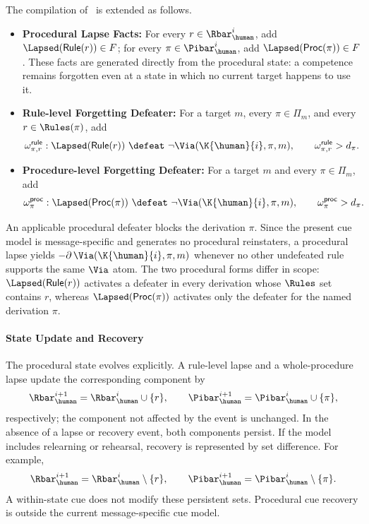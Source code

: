 The compilation of~ is extended as follows.
\begin{itemize}
    \item \textbf{Procedural Lapse Facts:} For every $r\in\Rbar_{\human}^{i}$, add $\Lapsed(\mathsf{Rule}(r))\in F$; for every $\pi\in\Pibar_{\human}^{i}$, add $\Lapsed(\mathsf{Proc}(\pi))\in F$. These facts are generated directly from the procedural state: a competence remains forgotten even at a state in which no current target happens to use it.

    \item \textbf{Rule-level Forgetting Defeater:} For a target $m$, every $\pi\in\Pi_m$, and every $r\in\Rules(\pi)$, add
    \[
        \omega^{\mathsf{rule}}_{\pi,r}: \Lapsed(\mathsf{Rule}(r)) \ \defeat\ \neg\Via(\K{\human}{i},\pi,m), \qquad \omega^{\mathsf{rule}}_{\pi,r}>d_\pi.
    \]

    \item \textbf{Procedure-level Forgetting Defeater:} For a target $m$ and every $\pi\in\Pi_m$, add
    \[
        \omega^{\mathsf{proc}}_{\pi}: \Lapsed(\mathsf{Proc}(\pi)) \ \defeat\ \neg\Via(\K{\human}{i},\pi,m), \qquad \omega^{\mathsf{proc}}_{\pi}>d_\pi.
    \]
\end{itemize}
An applicable procedural defeater blocks the derivation $\pi$. Since the present cue model is message-specific and generates no procedural reinstaters, a procedural lapse yields $-\partial\,\Via(\K{\human}{i},\pi,m)$ whenever no other undefeated rule supports the same $\Via$ atom. The two procedural forms differ in scope: $\Lapsed(\mathsf{Rule}(r))$ activates a defeater in every derivation whose $\Rules$ set contains $r$, whereas $\Lapsed(\mathsf{Proc}(\pi))$ activates only the defeater for the named derivation $\pi$.

\paragraph{State Update and Recovery}

The procedural state evolves explicitly. A rule-level lapse and a whole-procedure lapse update the corresponding component by
\[
    \Rbar_{\human}^{i+1} =\Rbar_{\human}^{i}\cup\{r\}, \qquad \Pibar_{\human}^{i+1} =\Pibar_{\human}^{i}\cup\{\pi\},
\]
respectively; the component not affected by the event is unchanged. In the absence of a lapse or recovery event, both components persist. If the model includes relearning or rehearsal, recovery is represented by set difference. For example,
\[
    \Rbar_{\human}^{i+1} =\Rbar_{\human}^{i}\setminus\{r\}, \qquad \Pibar_{\human}^{i+1} =\Pibar_{\human}^{i}\setminus\{\pi\}.
\]
A within-state cue does not modify these persistent sets. Procedural cue recovery is outside the current message-specific cue model.

